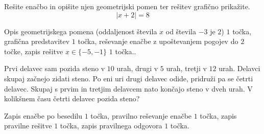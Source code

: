\documentclass[addpoints]{exam}
\begin{document}
\begin{questions}
    \question[5]
    Rešite enačbo in opišite njen geometrijski pomen ter rešitev grafično prikažite.
    $$  \left\lvert x+2\right\rvert=8 $$
    
    
    \begin{solution}[7cm]
        Opis geometrijskega pomena (oddaljenost števila $x$ od števila $-3$ je $2$) $1$ točka, grafična predstavitev $1$ točka, reševanje enačbe z upoštevanjem pogojev do $2$ točke, zapis rešitve $x\in\{-5,-1\}$ $1$ točka..
    \end{solution}


    \newpage





    
    



    \question[5]
    Prvi delavec sam pozida steno v $10$ urah, drugi v $5$ urah, tretji v $12$ urah. Delavci
    skupaj začnejo zidati steno. Po eni uri drugi delavec odide, pridruži pa se četrti delavec.
    Skupaj s prvim in tretjim delavcem nato končajo steno v dveh urah. V kolikšnem času četrti delavec
    pozida steno?
    
    
    \begin{solution}[13cm]
        
        Zapis enačbe po besedilu $1$ točka, pravilno reševanje enačbe $1$ točka, zapis pravilne rešitve $1$ točka, zapis pravilnega odgovora $1$ točka.
    \end{solution}






    



    

\end{questions}
\end{document}
